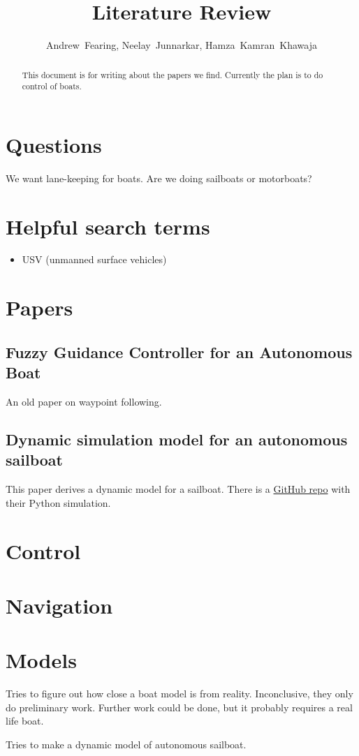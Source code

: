 \documentclass[conference]{IEEEtran}
\begin{document}
\title{Literature Review}
\author{Andrew~Fearing, Neelay~Junnarkar,  Hamza~Kamran~Khawaja}
\maketitle

\begin{abstract}
This document is for writing about the papers we find. Currently the plan is to do control of boats.
\end{abstract}

\section{Questions}
We want lane-keeping for boats. Are we doing sailboats or motorboats?
\section{Helpful search terms}
\begin{itemize}
    \item USV (unmanned surface vehicles)
    
\end{itemize}

\section{Papers}
\subsection{Fuzzy Guidance Controller for an Autonomous Boat}
\cite{Vaneck1997} An old paper on waypoint following.


\subsection{Dynamic simulation model for an autonomous sailboat}
\cite{Buehler2018} This paper derives a dynamic model for a sailboat. There is a \href{https://github.com/simonkohaut/stda-sailboat-simulator/tree/master/src}{GitHub repo} with their Python simulation.


\section{Control}
\cite{nan}
\section{Navigation}

\section{Models}
\cite{Huang2017} Tries to figure out how close a boat model is from reality. Inconclusive, they only do preliminary work. Further work could be done, but it probably requires a real life boat.

\cite{Setiawan2020} Tries to make a dynamic model of autonomous sailboat.


\end{document}
